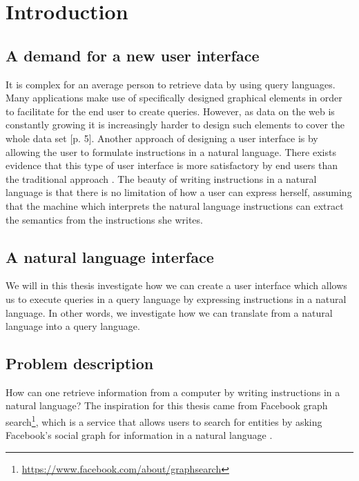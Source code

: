 \chapter{Introduction}\label{ch:introduction}
\section{A demand for a new user interface}
It is complex for an average person to retrieve data by using query languages. Many applications make use of specifically designed graphical elements in order to facilitate for the end user to create queries. However, as data on the web is constantly growing it is increasingly harder to design such elements to cover the whole data set \cite{damljanovic:2011}[p. 5].
\newline
\newline
Another approach of designing a user interface is by allowing the user to formulate instructions in a natural language. There exists evidence that this type of user interface is more satisfactory by end users than the traditional approach \cite{kaufmann:2007}.
\newline
\newline
The beauty of writing instructions in a natural language is that there is no limitation of how a user can express herself, assuming that the machine which interprets the natural language instructions can extract the semantics from the instructions she writes.

\section{A natural language interface}
We will in this thesis investigate how we can create a user interface which allows us to execute queries in a query language by expressing instructions in a natural language. In other words, we investigate how we can translate from a natural language into a query language. 

\section{Problem description\label{sec:problem-description}}
How can one retrieve information from a computer by writing instructions in a natural language? The inspiration for this thesis came from Facebook graph search\footnote{\url{https://www.facebook.com/about/graphsearch}}, which is a service that allows users to search for entities by asking Facebook's social graph for information in a natural language \cite{unicorn}.


